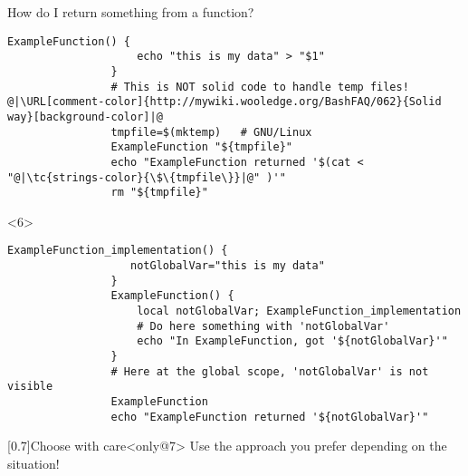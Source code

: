\begin{frame}[fragile]{How do I return something from a function?}
\begin{overlayarea}{\textwidth}{0.7\textheight}
\begin{onlyenv}
\begin{lstlisting}[style=MyBash, numbers=none]
                ExampleFunction() {
                    echo "this is my data" > "$1"
                }
                # This is NOT solid code to handle temp files! @|\URL[comment-color]{http://mywiki.wooledge.org/BashFAQ/062}{Solid way}[background-color]|@
                tmpfile=$(mktemp)   # GNU/Linux
                ExampleFunction "${tmpfile}"
                echo "ExampleFunction returned '$(cat < "@|\tc{strings-color}{\$\{tmpfile\}}|@" )'"
                rm "${tmpfile}"
            \end{lstlisting}
        \end{onlyenv}
        \begin{onlyenv}<6>
            \begin{lstlisting}[style=MyBash, numbers=none, emph={[7]notGlobalVar},]
                ExampleFunction_implementation() {
                   notGlobalVar="this is my data"
                }
                ExampleFunction() {
                    local notGlobalVar; ExampleFunction_implementation
                    # Do here something with 'notGlobalVar'
                    echo "In ExampleFunction, got '${notGlobalVar}'"
                }
                # Here at the global scope, 'notGlobalVar' is not visible
                ExampleFunction
                echo "ExampleFunction returned '${notGlobalVar}'"
            \end{lstlisting}
        \end{onlyenv}
        \vspace{-3mm}
        \begin{varblock}{}[0.7\textwidth]{Choose with care}<only@7>
            Use the approach you prefer depending on the situation!
        \end{varblock}
    \end{overlayarea}
\end{frame}

